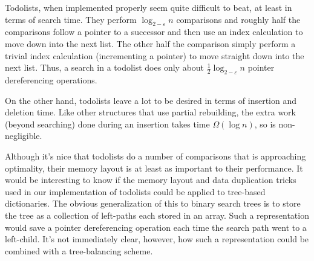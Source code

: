 \documentclass[lotsofwhite]{patmorin}
\newcommand{\eps}{\varepsilon}
\begin{document}
Todolists, when implemented properly seem quite difficult to beat, at
least in terms of search time.  They perform $\log_{2-\eps} n$ comparisons
and roughly half the comparisons follow a pointer to a successor
and then use an index calculation to move down into the next list.
The other half the comparison simply perform a trivial index calculation
(incrementing a pointer) to move straight down into the next list.
Thus, a search in a todolist does only about $\frac{1}{2}\log_{2-\eps}
n$ pointer dereferencing operations.

On the other hand, todolists leave a lot to be desired in terms of
insertion and deletion time.  Like other structures that use partial
rebuilding, the extra work (beyond searching) done during an insertion
takes time $\Omega(\log n)$, so is non-negligible.  

Although it's nice that todolists do a number of comparisons that is
approaching optimality, their memory layout is at least as important to
their performance.  It would be interesting to know if the memory layout
and data duplication tricks used in our implementation of todolists could
be applied to tree-based dictionaries.  The obvious generalization of this
to binary search trees is to store the tree as a collection of left-paths
each stored in an array. Such a representation would save a pointer
dereferencing operation each time the search path went to a left-child.
It's not immediately clear, however, how such a representation could be
combined with a tree-balancing scheme.
\end{document}
